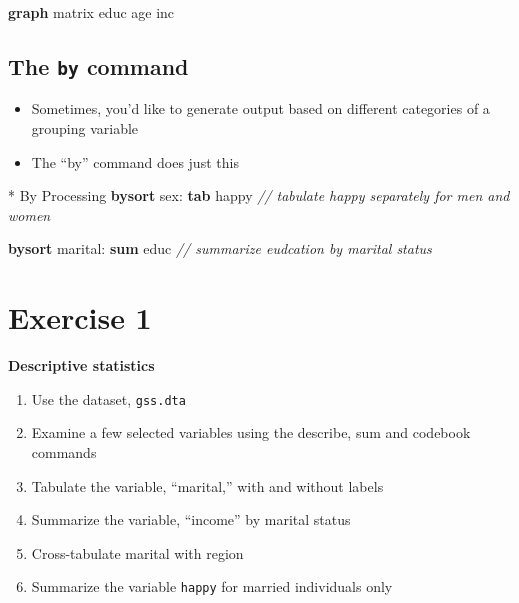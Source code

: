 \documentclass[]{book}
\newenvironment{Shaded}{\begin{snugshade}}{\end{snugshade}}
\newcommand{\CommentTok}[1]{\textcolor[rgb]{0.56,0.35,0.01}{\textit{#1}}}
\newcommand{\FunctionTok}[1]{\textcolor[rgb]{0.00,0.00,0.00}{#1}}
\newcommand{\KeywordTok}[1]{\textcolor[rgb]{0.13,0.29,0.53}{\textbf{#1}}}
\newcommand{\NormalTok}[1]{#1}
\providecommand{\tightlist}{%
  \setlength{\itemsep}{0pt}\setlength{\parskip}{0pt}}
\begin{document}
\begin{Shaded}
\begin{Highlighting}[]
\KeywordTok{graph} \FunctionTok{matrix}\NormalTok{ educ age inc}
\end{Highlighting}
\end{Shaded}

\hypertarget{the-by-command}{%
\subsection{\texorpdfstring{The \texttt{by} command}{The by command}}\label{the-by-command}}

\begin{itemize}
\tightlist
\item
  Sometimes, you'd like to generate output based on different categories of a grouping variable
\item
  The ``by'' command does just this
\end{itemize}

\begin{Shaded}
\begin{Highlighting}[]
\NormalTok{* By Processing}
\KeywordTok{bysort}\NormalTok{ sex: }\KeywordTok{tab}\NormalTok{ happy }\CommentTok{// tabulate happy separately for men and women}
\end{Highlighting}
\end{Shaded}

\begin{Shaded}
\begin{Highlighting}[]
\KeywordTok{bysort}\NormalTok{ marital: }\KeywordTok{sum}\NormalTok{ educ }\CommentTok{// summarize eudcation by marital status}
\end{Highlighting}
\end{Shaded}

\hypertarget{exercise-1-6}{%
\section{Exercise 1}\label{exercise-1-6}}

\textbf{Descriptive statistics}

\begin{enumerate}
\def\labelenumi{\arabic{enumi}.}
\tightlist
\item
  Use the dataset, \texttt{gss.dta}
\item
  Examine a few selected variables using the describe, sum and codebook commands
\item
  Tabulate the variable, ``marital,'' with and without labels
\item
  Summarize the variable, ``income'' by marital status
\item
  Cross-tabulate marital with region
\item
  Summarize the variable \texttt{happy} for married individuals only
\end{enumerate}
\end{document}
